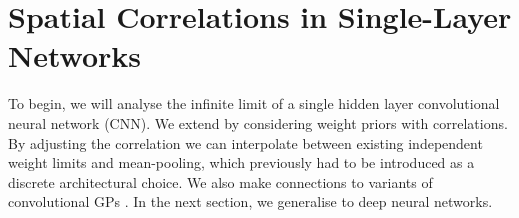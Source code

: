 \documentclass{article}
\theoremstyle{definition}
\begin{document}


\section{Spatial Correlations in Single-Layer Networks}
\label{sec:single-layer}
To begin, we will analyse the infinite limit of a single hidden layer
convolutional neural network (CNN). We extend \citet{garriga2018infiniteconv,novak2019infiniteconv} by considering weight priors with correlations. By adjusting the correlation we can interpolate between existing independent weight limits and mean-pooling, which previously had to be introduced as a discrete architectural choice. We also make connections to variants of convolutional GPs \citep{vdw2017convgp,dutordoir2020}. In the next section, we generalise to deep neural networks.

\end{document}

